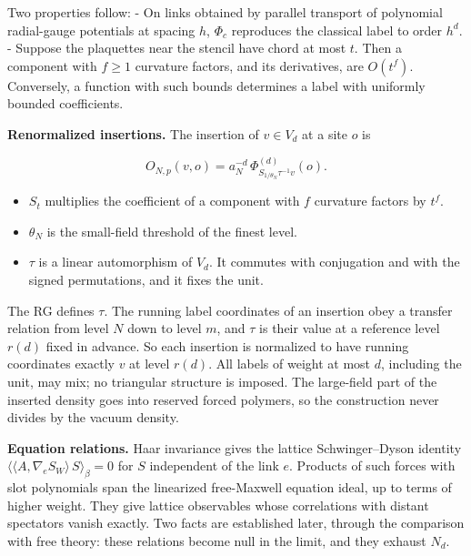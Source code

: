 \documentclass[
  letterpaper,
  11pt]{article}
\providecommand{\tightlist}{%
  \setlength{\itemsep}{0pt}\setlength{\parskip}{0pt}}
\begin{document}
Two properties follow: - On links obtained by parallel transport of
polynomial radial-gauge potentials at spacing \(h\), \(\Phi_c\)
reproduces the classical label to order \(h^d\). - Suppose the
plaquettes near the stencil have chord at most \(t\). Then a component
with \(f\ge1\) curvature factors, and its derivatives, are \(O(t^f)\).
Conversely, a function with such bounds determines a label with
uniformly bounded coefficients.

\textbf{Renormalized insertions.} The insertion of \(v\in V_d\) at a
site \(o\) is

\[O_{N,p}(v,o)=a_N^{-d}\,\Phi^{(d)}_{S_{1/\theta_N}\tau^{-1}v}(o).\]

\begin{itemize}
\tightlist
\item
  \(S_t\) multiplies the coefficient of a component with \(f\) curvature
  factors by \(t^f\).
\item
  \(\theta_N\) is the small-field threshold of the finest level.
\item
  \(\tau\) is a linear automorphism of \(V_d\). It commutes with
  conjugation and with the signed permutations, and it fixes the unit.
\end{itemize}

The RG defines \(\tau\). The running label coordinates of an insertion
obey a transfer relation from level \(N\) down to level \(m\), and
\(\tau\) is their value at a reference level \(r(d)\) fixed in advance.
So each insertion is normalized to have running coordinates exactly
\(v\) at level \(r(d)\). All labels of weight at most \(d\), including
the unit, may mix; no triangular structure is imposed. The large-field
part of the inserted density goes into reserved forced polymers, so the
construction never divides by the vacuum density.

\textbf{Equation relations.} Haar invariance gives the lattice
Schwinger--Dyson identity
\(\langle\langle A,\nabla_eS_W\rangle\,S\rangle_\beta=0\) for \(S\)
independent of the link \(e\). Products of such forces with slot
polynomials span the linearized free-Maxwell equation ideal, up to terms
of higher weight. They give lattice observables whose correlations with
distant spectators vanish exactly. Two facts are established later,
through the comparison with free theory: these relations become null in
the limit, and they exhaust \(N_d\).
\end{document}
